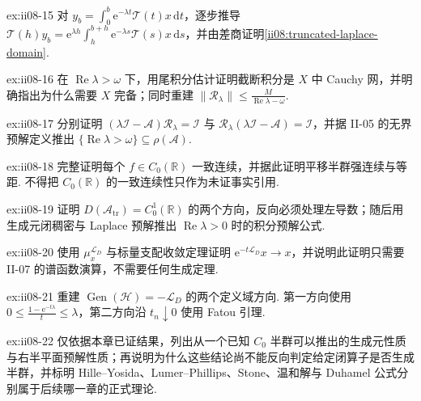 \begin{FAExercise}{ex:ii08-15}
对 \(\displaystyle y_b=\int_0^b\mathrm{e}^{-\lambda t}\mathcal T(t)x\,\mathrm{d}t\)，逐步推导 \(\displaystyle\mathcal T(h)y_b=\mathrm{e}^{\lambda h}\int_h^{b+h}\mathrm{e}^{-\lambda s}\mathcal T(s)x\,\mathrm{d}s\)，并由差商证明\autoref{ii08:truncated-laplace-domain}.
\end{FAExercise}

\begin{FAExercise}{ex:ii08-16}
在 \(\displaystyle\operatorname{Re}\lambda>\omega\) 下，用尾积分估计证明截断积分是 \(\displaystyle X\) 中 Cauchy 网，并明确指出为什么需要 \(\displaystyle X\) 完备；同时重建 \(\displaystyle\|\mathcal R_\lambda\|\leqslant \frac{M}{\operatorname{Re}\lambda-\omega}\).
\end{FAExercise}

\begin{FAExercise}[右半平面预解]{ex:ii08-17}
分别证明 \(\displaystyle(\lambda\mathcal I-\mathcal A)\mathcal R_\lambda=\mathcal I\) 与 \(\displaystyle\mathcal R_\lambda(\lambda\mathcal I-\mathcal A)=\mathcal I\)，并据 II-05 的无界预解定义推出 \(\displaystyle\{\operatorname{Re}\lambda>\omega\}\subseteq\rho(\mathcal A)\).
\end{FAExercise}

\begin{FAExercise}{ex:ii08-18}
完整证明每个 \(\displaystyle f\in C_0(\mathbb R)\) 一致连续，并据此证明平移半群强连续与等距. 不得把 \(\displaystyle C_0(\mathbb R)\) 的一致连续性只作为未证事实引用.
\end{FAExercise}

\begin{FAExercise}[平移生成元与预解]{ex:ii08-19}
证明 \(\displaystyle D(\mathcal A_{\mathrm{tr}})=C_0^1(\mathbb R)\) 的两个方向，反向必须处理左导数；随后用生成元闭稠密与 Laplace 预解推出 \(\displaystyle\operatorname{Re}\lambda>0\) 时的积分预解公式.
\end{FAExercise}

\begin{FAExercise}[热半群的强连续性]{ex:ii08-20}
使用 \(\displaystyle\mu_x^{\mathcal L_D}\) 与标量支配收敛定理证明 \(\displaystyle\mathrm{e}^{-t\mathcal L_D}x\to x\)，并说明此证明只需要 II-07 的谱函数演算，不需要任何生成定理.
\end{FAExercise}

\begin{FAExercise}[热半群生成元]{ex:ii08-21}
重建 \(\displaystyle\operatorname{Gen}(\mathcal H)=-\mathcal L_D\) 的两个定义域方向. 第一方向使用 \(\displaystyle0\leqslant\frac{1-\mathrm{e}^{-t\lambda}}{t}\leqslant\lambda\)，第二方向沿 \(\displaystyle t_n\downarrow0\) 使用 Fatou 引理.
\end{FAExercise}

\begin{FAExercise}[生成定理与后续理论边界]{ex:ii08-22}
仅依据本章已证结果，列出从一个已知 \(\displaystyle C_0\) 半群可以推出的生成元性质与右半平面预解性质；再说明为什么这些结论尚不能反向判定给定闭算子是否生成半群，并标明 Hille--Yosida、Lumer--Phillips、Stone、温和解与 Duhamel 公式分别属于后续哪一章的正式理论.
\end{FAExercise}
